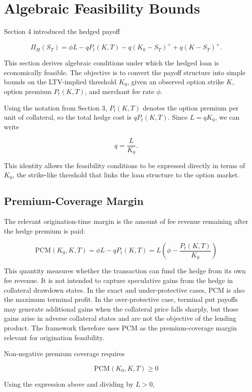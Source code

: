 \documentclass[11pt]{article}
\begin{document}
\section{Algebraic Feasibility Bounds}

Section 4 introduced the hedged payoff

$$
\Pi_H(S_T)=\phi L-qP_t(K,T)-q(K_0-S_T)^++q(K-S_T)^+.
$$

This section derives algebraic conditions under which the hedged loan is economically feasible. The objective is to convert the payoff structure into simple bounds on the LTV-implied threshold $K_0$, given an observed option strike $K$, option premium $P_t(K,T)$, and merchant fee rate $\phi$.

Using the notation from Section 3, $P_t(K,T)$ denotes the option premium per unit of collateral, so the total hedge cost is $qP_t(K,T)$. Since $L=qK_0$, we can write

$$
q=\frac{L}{K_0}.
$$

This identity allows the feasibility conditions to be expressed directly in terms of $K_0$, the strike-like threshold that links the loan structure to the option market.

\subsection{Premium-Coverage Margin}

The relevant origination-time margin is the amount of fee revenue remaining after the hedge premium is paid:

$$
\text{PCM}(K_0,K,T) = 
\phi L - qP_t(K,T) = 
L\left( \phi -\frac{P_t(K,T)}{K_0} \right)
$$

This quantity measures whether the transaction can fund the hedge from its own fee revenue. It is not intended to capture speculative gains from the hedge in collateral drawdown states. In the exact and under-protective cases, $\text{PCM}$ is also the maximum terminal profit. In the over-protective case, terminal put payoffs may generate additional gains when the collateral price falls sharply, but those gains arise in adverse collateral states and are not the objective of the lending product. The framework therefore uses $\text{PCM}$ as the premium-coverage margin relevant for origination feasibility.

Non-negative premium coverage requires

$$
\text{PCM}(K_0, K,T) \geq 0
$$

Using the expression above and dividing by $L>0$,
\end{document}

